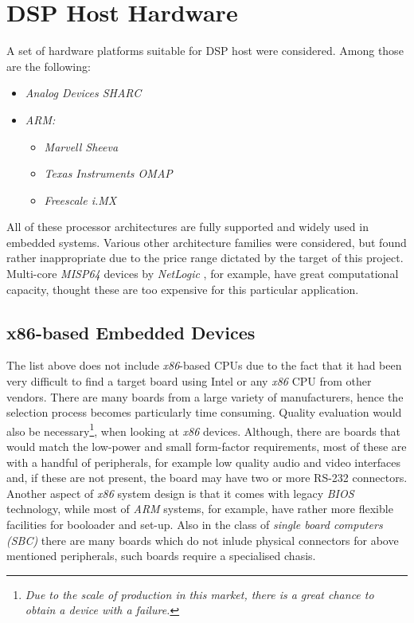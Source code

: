 \section{DSP Host Hardware}

  A set of hardware platforms suitable for DSP host were considered.
 Among those are the following:
 	\begin{itemize}
		\item \emph{Analog Devices SHARC}
		\item \emph{ARM:} \begin{itemize}
		\item \emph{Marvell Sheeva}
		\item \emph{Texas Instruments OMAP}
		\item \emph{Freescale i.MX}
		\end{itemize}
	\end{itemize}
 All of these processor architectures are fully supported and widely
 used in embedded systems. Various other architecture families were
 considered, but found rather inappropriate due to the price range
 dictated by the target of this project. Multi-core \emph{MISP64}
 devices by \emph{NetLogic} \cite{netlogic:mips64:multicore}, for
 example, have great computational capacity, thought these are too
 expensive for this particular application.

\subsection{x86-based Embedded Devices}

  The list above does not include \emph{x86}-based CPUs due to the
 fact that it had been very difficult to find a target board using
 Intel or any \emph{x86} CPU from other vendors. There are many boards
 from a large variety of manufacturers, hence the selection process
 becomes particularly time consuming. Quality evaluation would also
 be necessary\footnote{\emph{Due to the scale of production in this
 market, there is a great chance to obtain a device with a failure.}},
 when looking at \emph{x86} devices. Although, there are boards that
 would match the low-power and small form-factor requirements, most
 of these are with a handful of peripherals, for example low quality
 audio and video interfaces and, if these are not present, the board
 may have two or more RS-232 connectors. Another aspect of \emph{x86}
 system design is that it comes with legacy \emph{BIOS} technology,
 while most of \emph{ARM} systems, for example, have rather more
 flexible facilities for booloader and set-up. Also in the class of
 \emph{single board computers (SBC)} there are many boards which do
 not inlude physical connectors for above mentioned peripherals, such
 boards require a specialised chasis. 

